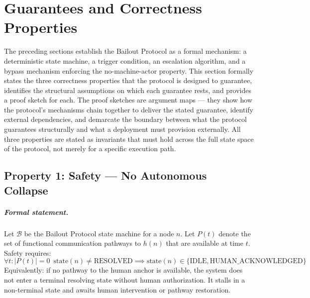 \section{Guarantees and Correctness Properties}
\label{sec:correctness-properties}

The preceding sections establish the Bailout Protocol as a formal mechanism: a deterministic state machine, a trigger condition, an escalation algorithm, and a bypass mechanism enforcing the no-machine-actor property. This section formally states the three correctness properties that the protocol is designed to guarantee, identifies the structural assumptions on which each guarantee rests, and provides a proof sketch for each. The proof sketches are argument maps — they show how the protocol's mechanisms chain together to deliver the stated guarantee, identify external dependencies, and demarcate the boundary between what the protocol guarantees structurally and what a deployment must provision externally. All three properties are stated as invariants that must hold across the full state space of the protocol, not merely for a specific execution path.

\subsection{Property 1: Safety — No Autonomous Collapse}


\subparagraph{Formal statement.} Let $\mathcal{B}$ be the Bailout Protocol state machine for a node $n$. Let $P(t)$ denote the set of functional communication pathways to $h(n)$ that are available at time $t$. Safety requires:
\begin{equation}
\forall t : |P(t)| = 0 \;\ \text{state}(n) \neq \text{RESOLVED} \implies \text{state}(n) \in \{\text{IDLE}, \text{HUMAN\_ACKNOWLEDGED}\}
\end{equation}
Equivalently: if no pathway to the human anchor is available, the system does not enter a terminal resolving state without human authorization. It stalls in a non-terminal state and awaits human intervention or pathway restoration.

